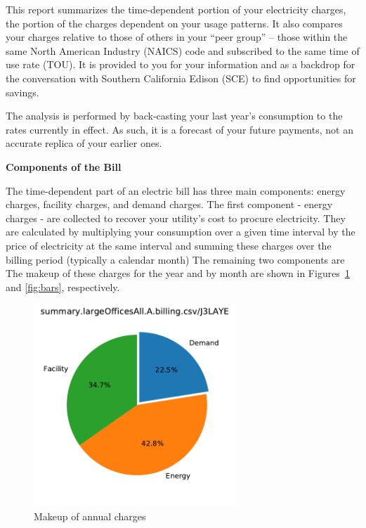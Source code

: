 \documentclass[11pt]{article}
\begin{document}
\pagestyle{title}
This report summarizes the time-dependent portion of your electricity charges, the portion of the charges dependent on your usage patterns. It also compares your charges relative to those of others in your ``peer group'' -- those within the same North American Industry (NAICS) code and subscribed to the same time of use rate (TOU). It is provided to you for your information and as a backdrop for the conversation with Southern California Edison (SCE) to find opportunities for savings.

The analysis is performed by back-casting your last year's consumption to the rates currently in effect. As such, it is a forecast of your future payments, not an accurate replica of your earlier ones. 

\vspace{3ex}
\textbf{\Large Components of the Bill}
\vspace{1ex}

The time-dependent part of an electric bill has three main components: energy charges, facility charges, and demand charges. The first component - energy charges - are collected to recover your utility's cost to procure electricity. They are calculated by multiplying your consumption over a given time interval by the price of electricity at the same interval and summing these charges over the billing period (typically a calendar month) The remaining two components are  The makeup of these charges for the year and by month are shown in Figures~\ref{fig:pie} and \ref{fig:bars}, respectively.
\begin{figure}[!h]
\centering
\includegraphics[height=3in, page=1, trim=0in 0.45in 0in 0.45in, clip]{visuals/J3LAYE.piechart.pdf}
\caption{Makeup of annual charges}
\label{fig:pie}
\end{figure}
\end{document}
